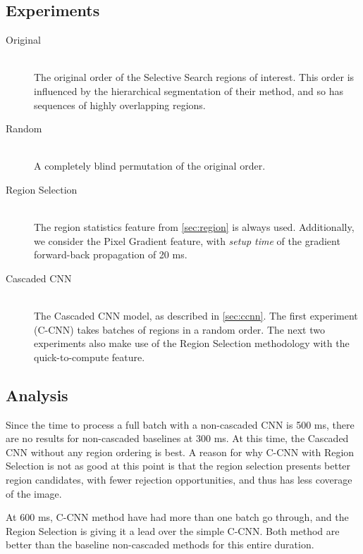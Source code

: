 \subsection{Experiments}
\begin{description}
  \item[Original] \hfill \\
  The original order of the Selective Search regions of interest.
  This order is influenced by the hierarchical segmentation of their method, and so has sequences of highly overlapping regions.

  \item[Random] \hfill \\
  A completely blind permutation of the original order.

  \item[Region Selection] \hfill \\
  The region statistics feature from \autoref{sec:region} is always used.
  Additionally, we consider the Pixel Gradient feature, with \emph{setup time} of the gradient forward-back propagation of 20 ms.

  \item[Cascaded CNN] \hfill \\
  The Cascaded CNN model, as described in \autoref{sec:ccnn}.
  The first experiment (C-CNN) takes batches of regions in a random order.
  The next two experiments also make use of the Region Selection methodology with the quick-to-compute feature.
\end{description}

\subsection{Analysis}
Since the time to process a full batch with a non-cascaded CNN is 500 ms, there are no results for non-cascaded baselines at 300 ms.
At this time, the Cascaded CNN without any region ordering is best.
A reason for why C-CNN with Region Selection is not as good at this point is that the region selection presents better region candidates, with fewer rejection opportunities, and thus has less coverage of the image.

At 600 ms, C-CNN method have had more than one batch go through, and the Region Selection is giving it a lead over the simple C-CNN.
Both method are better than the baseline non-cascaded methods for this entire duration.

